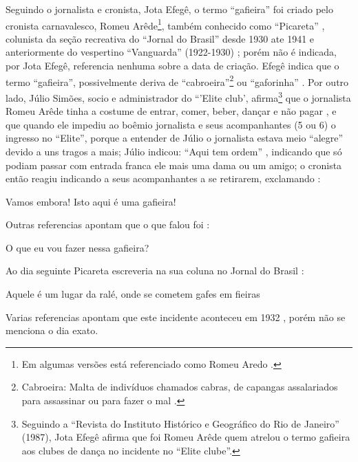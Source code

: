 Seguindo o jornalista e cronista, Jota Efegê, %
o termo ``gafieira'' foi criado pelo cronista carnavalesco, 
Romeu Arêde\footnote{Em algumas versões está  referenciado como Romeu Aredo \cite[pp. 188]{raca1999}.}, 
também conhecido como ``Picareta'' \cite[pp. 29]{instituto1987revista}\cite[pp. 3 - cad. 3]{juliosimoes} 
\cite[pp. 21]{efege1974maxixe} \cite[pp. 78]{coutinho2006cronistas}, 
colunista da seção recreativa do ``Jornal do Brasil'' desde 1930 ate 1941
e anteriormente do vespertino ``Vanguarda'' (1922-1930) \cite[pp. 58-59]{efege1982figuras} 
\cite[pp. 6 - cad. B]{entrevistajuliojournalbrasil1};
porém não é indicada, por Jota Efegê, referencia nenhuma sobre a data de criação.
Efegê indica que o termo ``gafieira'', possivelmente deriva de 
``cabroeira''\footnote{Cabroeira: Malta de indivíduos chamados cabras, 
de capangas assalariados para assassinar ou para fazer o mal \cite{diciocabroeira}.} 
ou ``gaforinha'' \cite[pp. 3 - cad. 3]{juliosimoes}.
Por outro lado, Júlio Simões, socio e administrador do ``'Elite club', 
afirma\footnote{Seguindo a ``Revista do Instituto Histórico e Geográfico do Rio de Janeiro'' (1987),
Jota Efegê afirma que foi Romeu Arêde quem atrelou o termo gafieira aos clubes de dança no incidente no ``Elite clube''.} 
que o jornalista Romeu Arêde tinha a costume de entrar, 
comer, beber, dançar e não pagar \cite[pp.13 ]{respeitojournalbrasil1},
e que quando ele impediu ao boêmio jornalista e seus acompanhantes (5 ou 6) o ingresso no ``Elite'', 
porque a entender de Júlio o jornalista estava meio ``alegre'' devido a uns tragos a mais;
 Júlio indicou: ``Aqui tem ordem'' 
\cite[pp.13 ]{respeitojournalbrasil1} \cite[pp. 6]{gafieiraaredeout2} \cite[pp. 3 - Encontro]{gafieiraaredeout1},
indicando que só podiam passar com entrada franca ele mais uma dama ou um amigo;
o cronista então reagiu indicando a seus acompanhantes a se retirarem, 
exclamando \cite[pp. 29]{instituto1987revista} \cite[pp. 6 - Tribuna Bis]{gafieiraaredeout3}: 
\begin{citando}
Vamos embora! Isto aqui é uma gafieira!
\end{citando}
Outras referencias apontam que o que falou foi \cite[pp. 6]{gafieiraaredeout2} \cite[pp. 3 - Encontro]{gafieiraaredeout1}:
\begin{citando}
O que eu vou fazer nessa gafieira?
\end{citando}
Ao dia seguinte Picareta escreveria na sua coluna no Jornal do Brasil \cite[pp. 188]{raca1999}:
\begin{citando}
Aquele é um lugar da ralé, onde se cometem gafes em fieiras
\end{citando}
Varias referencias apontam que este incidente aconteceu em 1932 \cite[pp. 3 - Encontro]{gafieiraaredeout1} \cite[pp. 188]{raca1999}, 
porém não se menciona o dia exato. 




